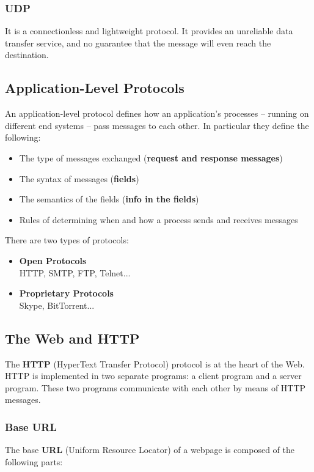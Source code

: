 \documentclass{article}
\begin{document}
\subsubsection{UDP}
It is a connectionless and lightweight protocol. It provides an unreliable data transfer service, and no guarantee that the message will even reach the destination.

\subsection{Application-Level Protocols}
An application-level protocol defines how an application's processes -- running on different end systems -- pass messages to each other. In particular they define the following:

\begin{itemize}
	\item The type of messages exchanged (\textbf{request and response messages})
	\item The syntax of messages (\textbf{fields})
	\item The semantics of the fields (\textbf{info in the fields})
	\item Rules of determining when and how a process sends and receives messages
\end{itemize}

There are two types of protocols:
\begin{itemize}
	\item \textbf{Open Protocols}
	\vspace{.2cm} \\
	HTTP, SMTP, FTP, Telnet...
	
	\item \textbf{Proprietary Protocols}
	\vspace{.2cm} \\
	Skype, BitTorrent...
\end{itemize}

\subsection{The Web and HTTP}
The \textbf{HTTP} (HyperText Transfer Protocol) protocol is at the heart of the Web. HTTP is implemented in two separate programs: a client program and a server program. These two programs communicate with each other by means of HTTP messages.

\subsubsection{Base URL}
The base \textbf{URL} (Uniform Resource Locator) of a webpage is composed of the following parts:
\end{document}
